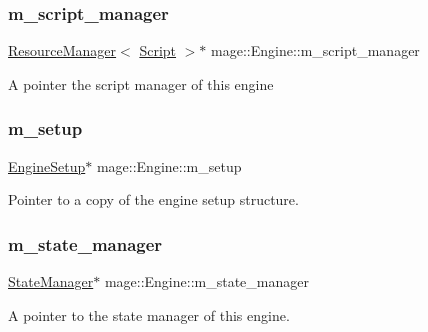 \subsubsection{\texorpdfstring{m\+\_\+script\+\_\+manager}{m\_script\_manager}}
{\footnotesize\ttfamily \hyperlink{classmage_1_1_resource_manager}{Resource\+Manager}$<$ \hyperlink{classmage_1_1_script}{Script} $>$$\ast$ mage\+::\+Engine\+::m\+\_\+script\+\_\+manager\hspace{0.3cm}{\ttfamily [private]}}

A pointer the script manager of this engine \hypertarget{classmage_1_1_engine_a825715684015ac2a43cfc5b6bf3b083f}{}\label{classmage_1_1_engine_a825715684015ac2a43cfc5b6bf3b083f} 
\subsubsection{\texorpdfstring{m\+\_\+setup}{m\_setup}}
{\footnotesize\ttfamily \hyperlink{structmage_1_1_engine_setup}{Engine\+Setup}$\ast$ mage\+::\+Engine\+::m\+\_\+setup\hspace{0.3cm}{\ttfamily [private]}}

Pointer to a copy of the engine setup structure. \hypertarget{classmage_1_1_engine_a7a0c463c67c3375b896809be9046113d}{}\label{classmage_1_1_engine_a7a0c463c67c3375b896809be9046113d} 
\subsubsection{\texorpdfstring{m\+\_\+state\+\_\+manager}{m\_state\_manager}}
{\footnotesize\ttfamily \hyperlink{classmage_1_1_state_manager}{State\+Manager}$\ast$ mage\+::\+Engine\+::m\+\_\+state\+\_\+manager\hspace{0.3cm}{\ttfamily [private]}}

A pointer to the state manager of this engine. 